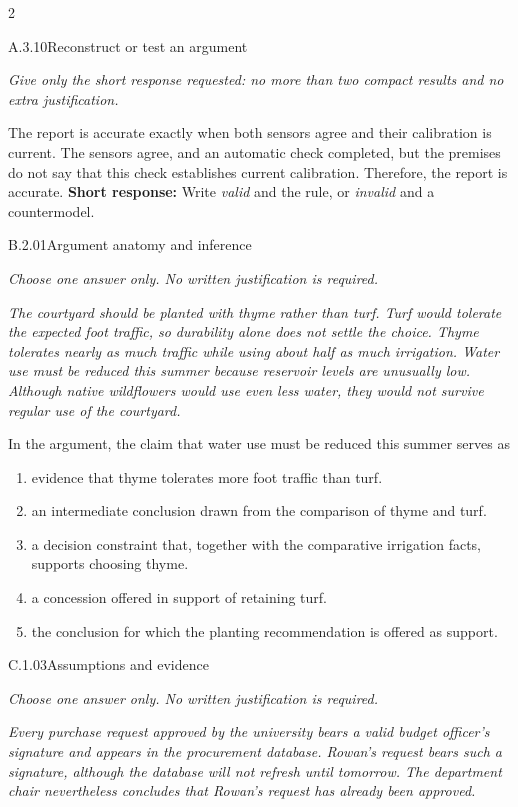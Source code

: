 \documentclass[9pt]{extarticle}
\newcommand{\choice}[1]{\item #1}
\begin{document}
\begin{multicols}{2}
\begin{DenseCoreProblem}{A.3.10}{Reconstruct or test an argument}
{\scriptsize\textit{Give only the short response requested: no more than two compact results and no extra justification.}\par}
The report is accurate exactly when both sensors agree and their calibration is current. The sensors agree, and an automatic check completed, but the premises do not say that this check establishes current calibration. Therefore, the report is accurate.
\textbf{Short response:} Write \emph{valid} and the rule, or \emph{invalid} and a countermodel.
\end{DenseCoreProblem}
\begin{DenseCoreProblem}{B.2.01}{Argument anatomy and inference}
{\scriptsize\textit{Choose one answer only. No written justification is required.}\par}
\emph{The courtyard should be planted with thyme rather than turf. Turf would tolerate the expected foot traffic, so durability alone does not settle the choice. Thyme tolerates nearly as much traffic while using about half as much irrigation. Water use must be reduced this summer because reservoir levels are unusually low. Although native wildflowers would use even less water, they would not survive regular use of the courtyard.}

In the argument, the claim that water use must be reduced this summer serves as
\begin{enumerate}[label=(\alph*)]
  \choice{evidence that thyme tolerates more foot traffic than turf.}
  \choice{an intermediate conclusion drawn from the comparison of thyme and turf.}
  \choice{a decision constraint that, together with the comparative irrigation facts, supports choosing thyme.}
  \choice{a concession offered in support of retaining turf.}
  \choice{the conclusion for which the planting recommendation is offered as support.}
\end{enumerate}
\end{DenseCoreProblem}
\columnbreak
\begin{DenseCoreProblem}{C.1.03}{Assumptions and evidence}
{\scriptsize\textit{Choose one answer only. No written justification is required.}\par}
\emph{Every purchase request approved by the university bears a valid budget officer's signature and appears in the procurement database. Rowan's request bears such a signature, although the database will not refresh until tomorrow. The department chair nevertheless concludes that Rowan's request has already been approved.}


\end{DenseCoreProblem}
\end{multicols}
\end{document}

